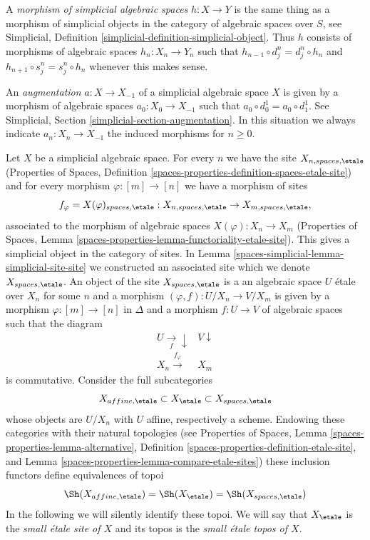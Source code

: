 \medskip\noindent
A {\it morphism of simplicial algebraic spaces} $h : X \to Y$ is the same
thing as a morphism of simplicial objects in
the category of algebraic spaces over $S$,
see Simplicial, Definition \ref{simplicial-definition-simplicial-object}.
Thus $h$ consists of morphisms of algebraic spaces $h_n : X_n \to Y_n$
such that $h_{n - 1} \circ d^n_j = d^n_j \circ h_n$ and
$h_{n + 1} \circ s^n_j = s^n_j \circ h_n$ whenever this makes sense.

\medskip\noindent
An {\it augmentation} $a : X \to X_{-1}$
of a simplicial algebraic space $X$ is given by a morphism
of algebraic spaces $a_0 : X_0 \to X_{-1}$
such that $a_0 \circ d^1_0 = a_0 \circ d^1_1$.
See Simplicial, Section \ref{simplicial-section-augmentation}.
In this situation we always indicate $a_n : X_n \to X_{-1}$ the induced
morphisms for $n \geq 0$.

\medskip\noindent
Let $X$ be a simplicial algebraic space. For every $n$ we have the
site $X_{n, spaces, \etale}$ (Properties of Spaces, Definition
\ref{spaces-properties-definition-spaces-etale-site})
and for every morphism $\varphi : [m] \to [n]$ we have a morphism of sites
$$
f_\varphi = X(\varphi)_{spaces, \etale} :
X_{n, spaces, \etale} \to X_{m, spaces, \etale},
$$
associated to the morphism of algebraic spaces
$X(\varphi) : X_n \to X_m$ (Properties of Spaces, Lemma
\ref{spaces-properties-lemma-functoriality-etale-site}).
This gives a simplicial object in the category of sites.
In Lemma \ref{spaces-simplicial-lemma-simplicial-site-site} we constructed an associated
site which we denote $X_{spaces, \etale}$.
An object of the site $X_{spaces, \etale}$ is a
an algebraic space $U$ \'etale over $X_n$ for some $n$
and a morphism $(\varphi, f) : U/X_n \to V/X_m$ is given
by a morphism $\varphi : [m] \to [n]$ in $\Delta$ and a morphism
$f : U \to V$ of algebraic spaces such that the diagram
$$
\begin{array}{cc}U \underset{f}{\longrightarrow}\downarrow & V \downarrow \\ X_n \overset{f_\varphi}{\longrightarrow} & X_m\end{array}
$$
is commutative. Consider the full subcategories
$$
X_{affine, \etale} \subset X_\etale \subset X_{spaces, \etale}
$$
whose objects are $U/X_n$ with $U$ affine, respectively a scheme.
Endowing these categories with their natural topologies
(see
Properties of Spaces, Lemma \ref{spaces-properties-lemma-alternative},
Definition \ref{spaces-properties-definition-etale-site}, and
Lemma \ref{spaces-properties-lemma-compare-etale-sites})
these inclusion functors define equivalences of topoi
$$
\Sh(X_{affine, \etale}) = \Sh(X_\etale) = \Sh(X_{spaces, \etale})
$$
In the following we will silently identify these topoi.
We will say that $X_\etale$ is the {\it small \'etale site of $X$}
and its topos is the {\it small \'etale topos of $X$}.

